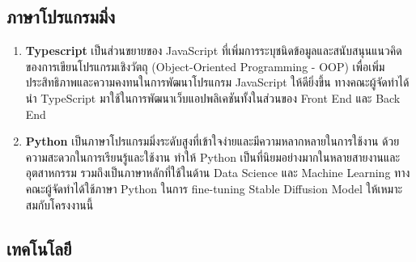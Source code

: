 \documentclass[12pt,oneside,openright,a4paper]{cpe-thai-project}
\begin{document}
\subsection{ภาษาโปรแกรมมิ่ง}

\begin{enumerate}
  \item \textbf{Typescript} เป็นส่วนขยายของ JavaScript ที่เพิ่มการระบุชนิดข้อมูลและสนับสนุนแนวคิดของการเขียนโปรแกรมเชิงวัตถุ (Object-Oriented Programming - OOP) เพื่อเพิ่มประสิทธิภาพและความคงทนในการพัฒนาโปรแกรม JavaScript ให้ดียิ่งขึ้น ทางคณะผู้จัดทำได้นำ TypeScript มาใช้ในการพัฒนาเว็บแอปพลิเคชันทั้งในส่วนของ Front End และ Back End
  \item \textbf{Python} เป็นภาษาโปรแกรมมิ่งระดับสูงที่เข้าใจง่ายและมีความหลากหลายในการใช้งาน ด้วยความสะดวกในการเรียนรู้และใช้งาน ทำให้ Python เป็นที่นิยมอย่างมากในหลายสายงานและอุตสาหกรรม รวมถึงเป็นภาษาหลักที่ใช้ในด้าน Data Science และ Machine Learning ทางคณะผู้จัดทำได้ใช้ภาษา Python ในการ fine-tuning Stable Diffusion Model ให้เหมาะสมกับโครงงานนี้
\end{enumerate}

\subsection{เทคโนโลยี}
\end{document}
